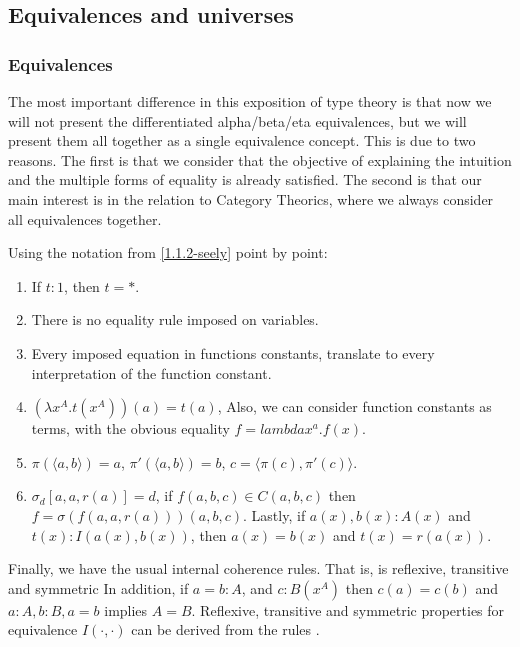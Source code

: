 \subsection{Equivalences and universes}
\subsubsection{Equivalences}

The most important difference in this exposition of type theory is that now we will not present the differentiated alpha/beta/eta equivalences, but we will present them all together as a single equivalence concept. This is due to two reasons. The first is that we consider that the objective of explaining the intuition and the multiple forms of equality is already satisfied. The second is that our main interest is in the relation to Category Theorics, where we always consider all equivalences together.


\begin{definition}
  Using the notation from \ref{1.1.2-seely} point by point:
  \begin{enumerate}
  \item If $t:1$, then $t=*$.
  \item There is no equality rule imposed on variables.
  \item Every imposed equation in functions constants, translate to every interpretation of the function constant.
  \item $(\lambda x^A.t(x^A))(a) =  t(a)$, Also, we can consider function constants as terms, with the obvious equality $f = lambda x^a.f(x)$.
  \item $\pi(\langle a,b\rangle) = a$,  $\pi'(\langle a, b\rangle) = b$, $c=\langle \pi(c),\pi'(c)\rangle$.
  \item $\sigma_d[a,a,r(a)]=d$, if $f(a,b,c)\in C(a,b,c)$ then $f=\sigma(f(a,a,r(a)))(a,b,c)$. Lastly, if $a(x), b(x):A(x)$ and $t(x) : I(a(x),b(x))$, then $a(x)=b(x)$ and $t(x)=r(a(x))$.
  \end{enumerate}

  Finally, we have the  usual internal coherence rules. That is, is reflexive, transitive and symmetric In addition, if $a=b : A$, and $c:B(x^A)$ then $c(a)=c(b)$ and $a:A, b:B, a=b$ implies $A=B$. Reflexive, transitive and symmetric properties for equivalence $I(\cdot, \cdot)$ can be derived from the rules \cite[1.3]{seely1984locally}.
\end{definition}

